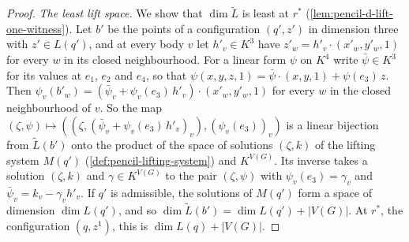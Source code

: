 \begin{proof}
  \emph{The least lift space.} We show that $\dim \widetilde L$ is least
  at $r^*$ (\cref{lem:pencil-d-lift-one-witness}). Let $b'$ be the points
  of a configuration $(q', z')$ in dimension three with $z' \in L(q')$,
  and at every body $v$ let $h'_v \in K^3$ have
  $z'_w = h'_v \cdot (x'_w, y'_w, 1)$ for every $w$ in its closed
  neighbourhood. For a linear form $\psi$ on $K^4$ write
  $\bar\psi \in K^3$ for its values at $e_1$, $e_2$ and $e_4$, so that
  $\psi(x, y, z, 1) = \bar\psi \cdot (x, y, 1) + \psi(e_3)\, z$. Then
  $\psi_v(b'_w) = (\bar\psi_v + \psi_v(e_3)\, h'_v) \cdot (x'_w, y'_w, 1)$
  for every $w$ in the closed neighbourhood of $v$. So the map
  $(\zeta, \psi) \mapsto ((\zeta, (\bar\psi_v + \psi_v(e_3)\, h'_v)_v),
  (\psi_v(e_3))_v)$ is a linear bijection from $\widetilde L(b')$ onto
  the product of the space of solutions $(\zeta, k)$ of the lifting
  system $M(q')$ (\cref{def:pencil-lifting-system}) and $K^{V(G)}$. Its
  inverse takes a solution $(\zeta, k)$ and $\gamma \in K^{V(G)}$ to the
  pair $(\zeta, \psi)$ with $\psi_v(e_3) = \gamma_v$ and
  $\bar\psi_v = k_v - \gamma_v h'_v$. If $q'$ is admissible, the solutions of
  $M(q')$ form a space of dimension $\dim L(q')$, and so
  $\dim \widetilde L(b') = \dim L(q') + |V(G)|$. At $r^*$, the
  configuration $(q, z^1)$, this is $\dim L(q) + |V(G)|$.


\end{proof}

